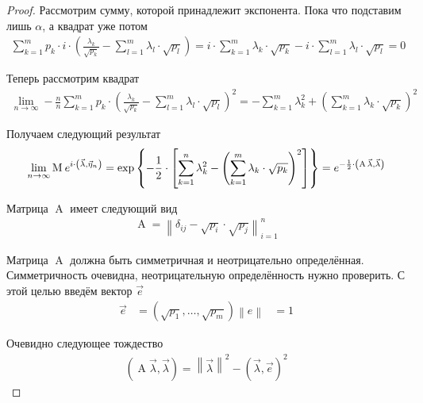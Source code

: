 \begin{proof}
  Рассмотрим сумму, которой принадлежит экспонента. Пока что подставим лишь
  $\alpha$, а квадрат уже потом
  \begin{align*}
      \sum_{k=1}^{m} p_k \cdot i
       \cdot \left(\frac{\lambda_k}{\sqrt{p_k}}
          - \sum_{l=1}^{m}\lambda_l \cdot \sqrt{p_l} \right)
      = i \cdot \sum_{k=1}^{m} \lambda_k \cdot \sqrt{p_k}
      - i \cdot \sum_{l=1}^{m} \lambda_l \cdot \sqrt{p_l}
      = 0
  \end{align*}

  Теперь рассмотрим квадрат
  \begin{align*}
      \lim_{n \to \infty} -\frac{n}{n}\sum_{k=1}^{m} p_k
      \cdot \left( \frac{\lambda_k}{\sqrt{p_k}}
      - \sum_{l=1}^{m}\lambda_l \cdot \sqrt{p_l} \right)^2
      = - \sum_{k=1}^{m}\lambda_k^2
      + \left( \sum_{k=1}^{m}\lambda_k \cdot \sqrt{p_k} \right)^2
  \end{align*}

  Получаем следующий результат
  \begin{align*}
      \lim_{n \to \infty} \operatorname{M}_{} e^{
      i \cdot \left( \vec{\lambda}, \vec{\eta}_n \right)}
      = \exp{\left\{ - \frac{1}{2} \cdot \left[ \sum_{k=1}^{n}\lambda_k^2
          - \left( \sum_{k=1}^{m}\lambda_k \cdot \sqrt{p_k}
        \right)^2\right] \right\}}
      = e^{-\frac{1}{2} \cdot \left(
          \operatorname{A} \vec{\lambda}, \vec{\lambda} \right)}
  \end{align*}

  Матрица $\operatorname{A}$ имеет следующий вид
  \begin{align*}
      \operatorname{A}
      = \left\| \delta_{ij} - \sqrt{p_i} \cdot \sqrt{p_j} \right\|_{i=1}^n
  \end{align*}

  Матрица $\operatorname{A}$ должна быть симметричная и неотрицательно
  определённая. Симметричность очевидна, неотрицательную определённость
  нужно проверить. С этой целью введём вектор $\vec{e}$
  \begin{align*}
      \vec{e} &= \left( \sqrt{p_1}, \dots, \sqrt{p_m} \right)
      \left\| e \right\| &= 1
  \end{align*}

  Очевидно следующее тождество
  \begin{align*}
      \left( \operatorname{A} \vec{\lambda}, \vec{\lambda} \right)
      = \left\| \vec{\lambda} \right\|^2
      - \left( \vec{\lambda}, \vec{e} \right)^2
  \end{align*}


\end{proof}
